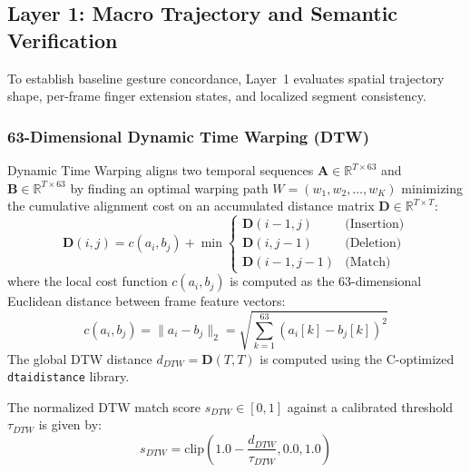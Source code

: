 \documentclass[conference]{IEEEtran}
\begin{document}
\subsection{Layer 1: Macro Trajectory and Semantic Verification}

To establish baseline gesture concordance, Layer~1 evaluates spatial trajectory shape, per-frame finger extension states, and localized segment consistency.

\subsubsection{63-Dimensional Dynamic Time Warping (DTW)}
Dynamic Time Warping aligns two temporal sequences $\mathbf{A} \in \mathbb{R}^{T \times 63}$ and $\mathbf{B} \in \mathbb{R}^{T \times 63}$ by finding an optimal warping path $W = (w_1, w_2, \ldots, w_K)$ minimizing the cumulative alignment cost on an accumulated distance matrix $\mathbf{D} \in \mathbb{R}^{T \times T}$:
\begin{equation}
\mathbf{D}(i, j) = c(a_i, b_j) + \min \begin{cases}
\mathbf{D}(i-1, j) & \text{(Insertion)} \\
\mathbf{D}(i, j-1) & \text{(Deletion)} \\
\mathbf{D}(i-1, j-1) & \text{(Match)}
\end{cases}
\end{equation}
where the local cost function $c(a_i, b_j)$ is computed as the 63-dimensional Euclidean distance between frame feature vectors:
\begin{equation}
c(a_i, b_j) = \|a_i - b_j\|_2 = \sqrt{\sum_{k=1}^{63} (a_i[k] - b_j[k])^2}
\end{equation}
The global DTW distance $d_{DTW} = \mathbf{D}(T, T)$ is computed using the C-optimized \texttt{dtaidistance} library.

The normalized DTW match score $s_{DTW} \in [0, 1]$ against a calibrated threshold $\tau_{DTW}$ is given by:
\begin{equation}
s_{DTW} = \text{clip}\left(1.0 - \frac{d_{DTW}}{\tau_{DTW}}, 0.0, 1.0\right)
\label{eq:score_dtw}
\end{equation}
\end{document}
